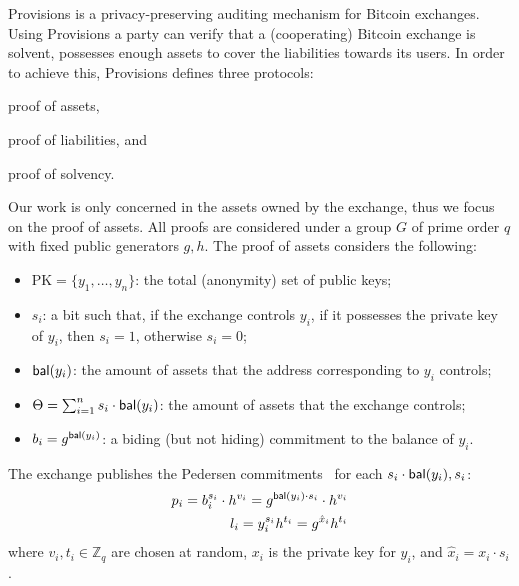 Provisions is a privacy-preserving auditing mechanism for Bitcoin exchanges.
Using Provisions a party can verify that a (cooperating) Bitcoin exchange is
solvent, \ie possesses enough assets to cover the liabilities towards its
users. In order to achieve this, Provisions defines three protocols:
\begin{inparaenum}[i)]
    \item proof of assets,
    \item proof of liabilities, and
    \item proof of solvency.
\end{inparaenum}
Our work is only concerned in the assets owned by the exchange, thus we focus
on the proof of assets. All proofs are considered under a group $G$ of prime
order $q$ with fixed public generators $g, h$. The proof of assets considers
the following:
\begin{itemize}
    \item $\text{PK} = \{y_1, \dots, y_n \}$: the total (anonymity) set of public keys;
    \item $s_i$: a bit such that, if the exchange controls $y_i$, \ie if it possesses the private key of $y_i$, then $s_i = 1$, otherwise $s_i = 0$;
    \item $\mathsf{bal}(y_i)$: the amount of assets that the address corresponding to $y_i$ controls;
    \item $\Theta = \sum_{i = 1}^n s_i \cdot \mathsf{bal}(y_i)$: the amount of assets that the exchange controls;
    \item $b_i = g^{\mathsf{bal}(y_i)}$: a biding (but not hiding) commitment  to the balance of $y_i$.
\end{itemize}
The exchange publishes the Pedersen commitments~\cite{C:Pedersen91} for each $s_i \cdot
\mathsf{bal}(y_i), s_i$:
\begin{align}
    p_i = b_i^{s_i} \cdot h^{v_i} = g^{\mathsf{bal}(y_i) \cdot s_i} \cdot h^{v_i} \label{eq:balance-commit} \\
    l_i = y_i^{s_i}h^{t_i} =  g^{\hat{x}_i}h^{t_i} \label{eq:ownership-commit}
\end{align}
where $v_i, t_i \in \mathbb{Z}_q$ are chosen at random,
$x_i$ is the private key for $y_i$, and $\hat{x}_i = x_i \cdot s_i$.

